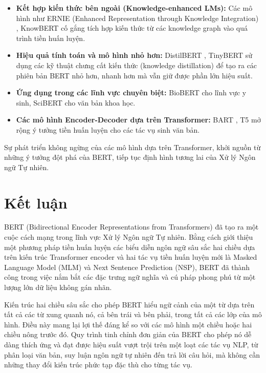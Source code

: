 \begin{itemize}
\begin{itemize}
        \end{itemize}
    \item \textbf{Kết hợp kiến thức bên ngoài (Knowledge-enhanced LMs):} Các mô hình như ERNIE (Enhanced Representation through Knowledge Integration) \cite{sun2019ernie}, KnowBERT \cite{peters2019knowledge} cố gắng tích hợp kiến thức từ các knowledge graph vào quá trình tiền huấn luyện.
    \item \textbf{Hiệu quả tính toán và mô hình nhỏ hơn:} DistilBERT \cite{sanh2019distilbert}, TinyBERT \cite{jiao2019tinybert} sử dụng các kỹ thuật chưng cất kiến thức (knowledge distillation) để tạo ra các phiên bản BERT nhỏ hơn, nhanh hơn mà vẫn giữ được phần lớn hiệu suất.
    \item \textbf{Ứng dụng trong các lĩnh vực chuyên biệt:} BioBERT \cite{lee2020biobert} cho lĩnh vực y sinh, SciBERT \cite{beltagy2019scibert} cho văn bản khoa học.
    \item \textbf{Các mô hình Encoder-Decoder dựa trên Transformer:} BART \cite{lewis2019bart}, T5 \cite{raffel2020exploring} mở rộng ý tưởng tiền huấn luyện cho các tác vụ sinh văn bản.
\end{itemize}
Sự phát triển không ngừng của các mô hình dựa trên Transformer, khởi nguồn từ những ý tưởng đột phá của BERT, tiếp tục định hình tương lai của Xử lý Ngôn ngữ Tự nhiên.

\section{Kết luận}
\label{sec:ket_luan}
BERT (Bidirectional Encoder Representations from Transformers) đã tạo ra một cuộc cách mạng trong lĩnh vực Xử lý Ngôn ngữ Tự nhiên. Bằng cách giới thiệu một phương pháp tiền huấn luyện các biểu diễn ngôn ngữ sâu sắc hai chiều dựa trên kiến trúc Transformer encoder và hai tác vụ tiền huấn luyện mới là Masked Language Model (MLM) và Next Sentence Prediction (NSP), BERT đã thành công trong việc nắm bắt các đặc trưng ngữ nghĩa và cú pháp phong phú từ một lượng lớn dữ liệu không gán nhãn.

Kiến trúc hai chiều sâu sắc cho phép BERT hiểu ngữ cảnh của một từ dựa trên tất cả các từ xung quanh nó, cả bên trái và bên phải, trong tất cả các lớp của mô hình. Điều này mang lại lợi thế đáng kể so với các mô hình một chiều hoặc hai chiều nông trước đó. Quy trình tinh chỉnh đơn giản của BERT cho phép nó dễ dàng thích ứng và đạt được hiệu suất vượt trội trên một loạt các tác vụ NLP, từ phân loại văn bản, suy luận ngôn ngữ tự nhiên đến trả lời câu hỏi, mà không cần những thay đổi kiến trúc phức tạp đặc thù cho từng tác vụ.

